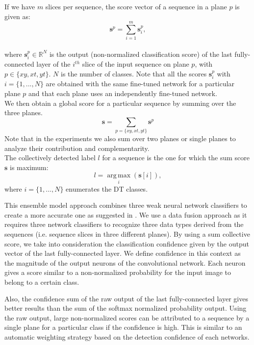 \documentclass[a4paper,11pt]{article}
\newcommand{\field}[1]{\mathbb{#1}}
\newcommand{\R}{\field{R}}
\DeclareMathOperator*{\argmax}{arg\,max}
\begin{document}
If we have $m$ slices per sequence, the score vector of a sequence in a plane $p$ is given as:
\begin{equation} \label{eq:score1}
\mathbf{s}^p = \sum\limits_{i=1}^m \mathbf{s}_{i}^p ,
\end{equation}
\\where $\mathbf{s}_{i}^p \in \R^N$ is the output (non-normalized classification score) of the last fully-connected layer of the $i^{th}$ slice of the input sequence on plane $p$, with $p \in \{xy, xt, yt\}$.
$N$ is the number of classes. Note that all the scores $\mathbf{s}_{i}^p$ with $i =\{1,...,N\}$ are obtained with the same fine-tuned network for a particular plane $p$ and that each plane uses an independently fine-tuned network.
\\We then obtain a global score for a particular sequence by summing over the three planes.
\begin{equation} \label{eq:score2}
\mathbf{s} = \sum\limits_{p=\{xy,xt,yt\}} \mathbf{s}^p
\end{equation}
Note that in the experiments we also sum over two planes or single planes to analyze their contribution and complementarity.
\\The collectively detected label $l$ for a sequence is the one for which the sum score $\mathbf{s}$ is maximum:
\begin{equation} \label{eq:score3}
l = \argmax\limits_{i}(\mathbf{s}[i]) ,
\end{equation}
where $i =\{1,...,N\}$ enumerates the DT classes.

This ensemble model approach combines three weak neural network classifiers to create a more accurate one as suggested in \cite{hansen1990neural}.
We use a data fusion approach as it requires three network classifiers to recognize three data types derived from the sequences (i.e. sequence slices in three different planes). 
By using a sum collective score, we take into consideration the classification confidence given by the output vector of the last fully-connected layer.
We define confidence in this context as the magnitude of the output neurons of the convolutional network. Each neuron gives a score similar to a non-normalized probability for the input image to belong to a certain class.

Also, the confidence sum of the raw output of the last fully-connected layer gives better results than the sum of the softmax normalized probability output.
Using the raw output, large non-normalized scores can be attributed to a sequence by a single plane for a particular class if the confidence is high.
This is similar to an automatic weighting strategy based on the detection confidence of each networks.
\end{document}

